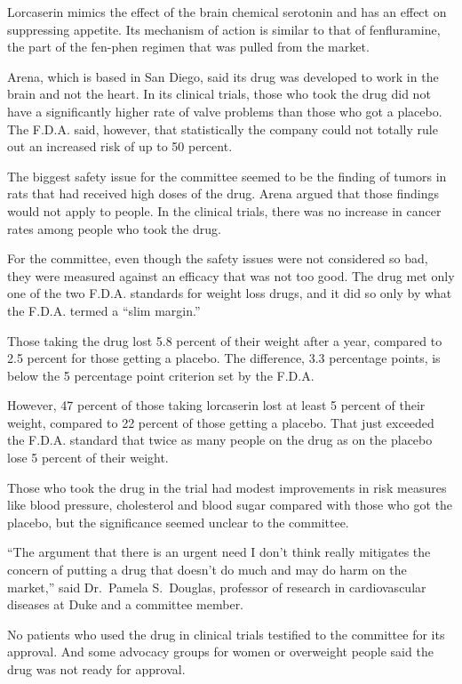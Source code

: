 ﻿\documentclass[12pt]{article}
\begin{document}
Lorcaserin mimics the effect of the brain chemical serotonin and has an effect on suppressing
appetite. Its mechanism of action is similar to that of fenfluramine, the part of the fen-phen
regimen that was pulled from the market.

Arena, which is based in San Diego, said its drug was developed to work in the brain and not the
heart. In its clinical trials, those who took the drug did not have a significantly higher rate of
valve problems than those who got a placebo. The F.D.A. said, however, that statistically the
company could not totally rule out an increased risk of up to 50 percent.

The biggest safety issue for the committee seemed to be the finding of tumors in rats that had
received high doses of the drug. Arena argued that those findings would not apply to people. In the
clinical trials, there was no increase in cancer rates among people who took the drug.

For the committee, even though the safety issues were not considered so bad, they were measured
against an efficacy that was not too good. The drug met only one of the two F.D.A. standards for
weight loss drugs, and it did so only by what the F.D.A. termed a ``slim margin.''

Those taking the drug lost 5.8 percent of their weight after a year, compared to 2.5 percent for
those getting a placebo. The difference, 3.3 percentage points, is below the 5 percentage point
criterion set by the F.D.A.

However, 47 percent of those taking lorcaserin lost at least 5 percent of their weight, compared to
22 percent of those getting a placebo. That just exceeded the F.D.A. standard that twice as many
people on the drug as on the placebo lose 5 percent of their weight.

Those who took the drug in the trial had modest improvements in risk measures like blood pressure,
cholesterol and blood sugar compared with those who got the placebo, but the significance seemed
unclear to the committee.

``The argument that there is an urgent need I don't think really mitigates the concern of putting a
drug that doesn't do much and may do harm on the market,'' said Dr.~Pamela S.~Douglas, professor of
research in cardiovascular diseases at Duke and a committee member.

No patients who used the drug in clinical trials testified to the committee for its approval. And
some advocacy groups for women or overweight people said the drug was not ready for approval.
\end{document}
